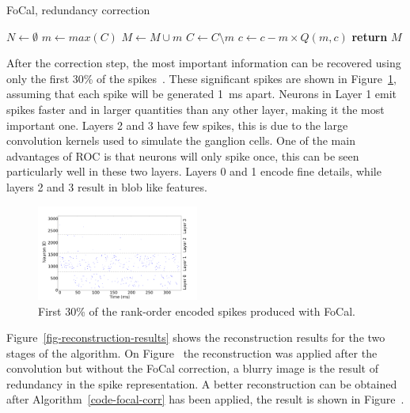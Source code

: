 \documentclass{frontiersENG} %
\begin{document}
\begin{algorithm}[h]
	\caption{FoCal, redundancy correction}
	\label{code-focal-corr}
	\begin{algorithmic}
		\State $N \leftarrow \emptyset$ 
		\Repeat
		\State $m \leftarrow max(C)$
		\State $M \leftarrow M \cup m$
		\State $C \leftarrow C \setminus m$
		 
		 
		\State $c \leftarrow c - m \times Q(m, c)$
		\EndIf
		\EndFor
		\State \textbf{return} $M$
		\EndProcedure
	\end{algorithmic}
\end{algorithm}


After the correction step, the most important information can be recovered using only the first 30\% of the spikes~\citep{sen2009evaluating}. These significant spikes are shown in Figure~\ref{fig-raster-plot-30pc}, assuming that each spike will be generated 1~ms apart. Neurons in Layer 1 emit spikes faster and in larger quantities than any other layer, making it the most important one. Layers 2 and 3 have few spikes, this is due to the large convolution kernels used to simulate the ganglion cells. One of the main advantages of ROC is that neurons will only spike once, this can be seen particularly well in these two layers. Layers 0 and 1 encode fine details, while layers 2 and 3 result in blob like features.
\begin{figure}[hbt]
	\centering
	\includegraphics[width=0.475\textwidth]{raster-plot-21-0-30pc}
	\caption{First 30\% of the rank-order encoded spikes produced with FoCal.}
	\label{fig-raster-plot-30pc}
\end{figure}

Figure~\ref{fig-reconstruction-results} shows the reconstruction results for the two stages of the algorithm. On Figure~ the reconstruction was applied after the convolution but without the FoCal correction, a blurry image is the result of redundancy in the spike representation. A better reconstruction can be obtained after Algorithm~\ref{code-focal-corr} has been applied, the result is shown in Figure~.
\end{document}
